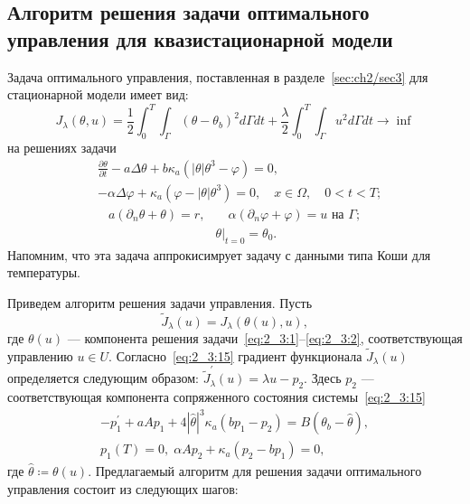 \subsection{Алгоритм решения задачи оптимального управления для квазистационарной модели}
\label{subsec:ch4/sec3/quasistationary}
Задача оптимального управления, поставленная в разделе~\ref{sec:ch2/sec3}
для стационарной модели имеет вид:
\begin{equation*}
    J_{\lambda}(\theta, u)=\frac{1}{2} \int_{0}^{T}
    \int_{\Gamma}\left(\theta-\theta_{b}\right)^{2} d \Gamma d t+\frac{\lambda}{2}
    \int_{0}^{T} \int_{\Gamma} u^{2} d \Gamma d t \rightarrow \inf
\end{equation*}
на решениях задачи
\begin{equation}
    \label{eq:4_3:1}
    \begin{split}
        & \frac{\partial \theta}{\partial t} - a \Delta \theta
        + b \kappa_{a} \left(|\theta| \theta^{3}-\varphi\right) = 0,\\
        & - \alpha \Delta \varphi
        + \kappa_{a} \left(\varphi-|\theta| \theta^{3}\right) = 0,
        \quad x \in \Omega, \quad 0 < t < T;
    \end{split}
\end{equation}
\begin{align}
    a \left(\partial_{n} \theta+\theta\right)=r,
    & \quad \alpha\left(\partial_{n} \varphi
    + \varphi\right) = u \text { на } \Gamma;  \label{eq:4_3:2}\\
    & \left.\theta\right|_{t=0} = \theta_{0}. \label{eq:4_3:3}
\end{align}
Напомним, что эта задача аппрокисимрует задачу с данными типа Коши для температуры.



Приведем алгоритм решения задачи управления.
Пусть
\[
    \widetilde{J}_{\lambda}(u)=J_{\lambda}(\theta(u), u),
\]
где $\theta(u)$ — компонента решения
задачи~\eqref{eq:2_3:1}--\eqref{eq:2_3:2},
соответствующая управлению $u \in U$.
Согласно~\eqref{eq:2_3:15} градиент функционала
$\widetilde{J}_{\lambda}(u)$ определяется
следующим образом: $\widetilde{J}_{\lambda}^{\prime}(u) = \lambda u-p_{2}$.
Здесь $p_{2}$ — соответствующая компонента сопряженного
состояния системы~\eqref{eq:2_3:15}
        \begin{gather*}
            -p_{1}^{\prime}+a A p_{1}+4|\widehat{\theta}|^{3} \kappa_{a}\left(b p_{1}
            -p_{2}\right)=B\left(\theta_{b}-\widehat{\theta}\right), \\
            p_{1}(T)=0,\; \alpha A p_{2}+\kappa_{a}\left(p_{2}-b p_{1}\right)=0,
        \end{gather*}
где $\widehat{\theta}\coloneqq\theta(u)$.
Предлагаемый алгоритм для решения задачи оптимального управления
состоит из следующих шагов:

